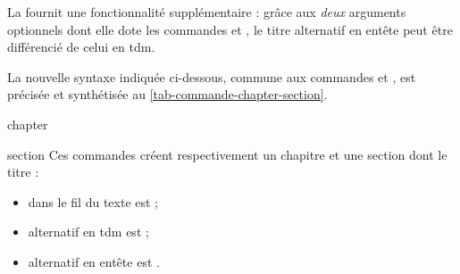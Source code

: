 La \yatCl{} fournit une fonctionnalité supplémentaire : grâce aux \emph{deux}
arguments optionnels dont elle dote les commandes  et
, le titre alternatif en entête peut être différencié de
celui en \gls{tdm}\signet{}.

La nouvelle syntaxe indiquée ci-dessous, commune aux commandes 
et ,
est précisée et synthétisée au \vref{tab-commande-chapter-section}.

\begin{docCommand}[doc new=2016-12-08]{chapter}{}
\end{docCommand}
%
\begin{docCommand}[doc new=2016-12-08]{section}{}
  Ces commandes créent respectivement un chapitre et une section dont le titre :
  \begin{itemize}
  \item dans le fil du texte est  ;
  \item alternatif en \gls{tdm}\signet{} est  ;
  \item alternatif en entête est .
  \end{itemize}
\end{docCommand}
%
\begin{table}[htb]
  \centering
  \caption{Usage des (deux arguments optionnels des) commandes
    \protect{} et \protect{}%
  }
  \label{tab-commande-chapter-section}
  
\end{table}

